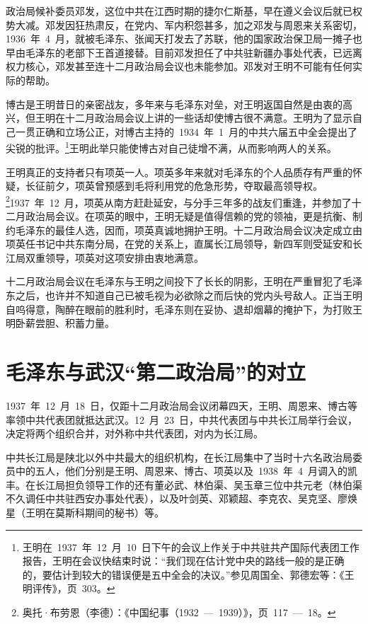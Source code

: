政治局候补委员邓发，这位中共在江西时期的捷尔仁斯基，早在遵义会议后就已权势大减。邓发因狂热肃反，在党内、军内积怨甚多，加之邓发与周恩来关系密切，1936~年~4~月，就被毛泽东、张闻天打发去了苏联，他的国家政治保卫局一摊子也早由毛泽东的老部下王首道接替。目前邓发担任了中共驻新疆办事处代表，已远离权力核心，邓发甚至连十二月政治局会议也未能参加。邓发对王明不可能有任何实际的帮助。

博古是王明昔日的亲密战友，多年来与毛泽东对垒，对王明返国自然是由衷的高兴，但王明在十二月政治局会议上讲的一些话却使博古很不满意。王明为了显示自己一贯正确和立场公正，对博古主持的~1934~年~1~月的中共六届五中全会提出了尖锐的批评。\footnote{王明在~1937~年~12~月~10~日下午的会议上作关于中共驻共产国际代表团工作报告，王明在会议快结束时说：“我们现在估计党中央的路线一般的是正确的，要估计到较大的错误便是五中全会的决议。”参见周国全、郭德宏等：《王明评传》，页~303。}王明此举只能使博古对自己徒增不满，从而影响两人的关系。

王明真正的支持者只有项英一人。项英多年来就对毛泽东的个人品质存有严重的怀疑，长征前夕，项英曾预感到毛将利用党的危急形势，夺取最高领导权。\footnote{奥托·布劳恩（李德）：《中国纪事（1932~—~1939）》，页~117~—~18。}1937~年~12~月，项英从南方赶赴延安，与分手三年多的战友们重逢，并参加了十二月政治局会议。在项英的眼中，王明无疑是值得信赖的党的领袖，更是抗衡、制约毛泽东的最佳人选，因而，项英真诚地拥护王明。十二月政治局会议决定成立由项英任书记中共东南分局，在党的关系上，直属长江局领导，新四军则受延安和长江局双重领导，项英对这项安排由衷地满意。

十二月政治局会议在毛泽东与王明之间投下了长长的阴影，王明在严重冒犯了毛泽东之后，也许并不知道自己已被毛视为必欲除之而后快的党内头号敌人。正当王明自呜得意，陶醉在眼前的胜利时，毛泽东则在妥协、退却烟幕的掩护下，为打败王明卧薪尝胆、积蓄力量。

\section{毛泽东与武汉“第二政治局”的对立}

1937~年~12~月~18~日，仅距十二月政治局会议闭幕四天，王明、周恩来、博古等率领中共代表团就抵达武汉。12~月~23~日，中共代表团与中共长江局举行会议，决定将两个组织合并，对外称中共代表团，对内为长江局。

中共长江局是陕北以外中共最大的组织机构，在长江局集中了当时十六名政治局委员中的五人，他们分别是王明、周恩来、博古、项英以及~1938~年~4~月调入的凯丰。在长江局担负领导工作的还有董必武、林伯渠、吴玉章三位中共元老（林伯渠不久调任中共驻西安办事处代表），以及叶剑英、邓颖超、李克农、吴克坚、廖焕星（王明在莫斯科期间的秘书）等。

